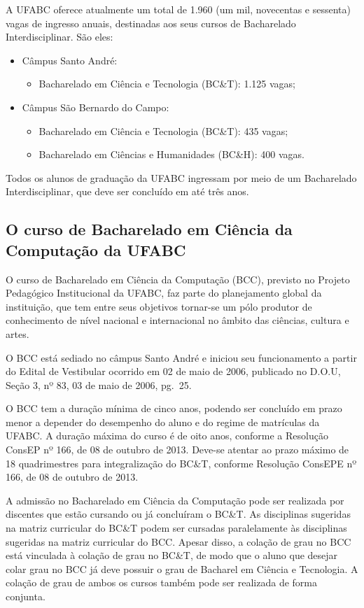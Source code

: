 A UFABC oferece atualmente um total de 1.960 (um mil, novecentas e sessenta)
vagas de ingresso anuais, destinadas aos seus cursos de Bacharelado
Interdisciplinar. São eles:
\begin{itemize}
    \item Câmpus Santo André:
    \begin{itemize}
        \item Bacharelado em Ciência e Tecnologia (BC\&T): 1.125 vagas;
    \end{itemize}
    \item Câmpus São Bernardo do Campo:
    \begin{itemize}
        \item Bacharelado em Ciência e Tecnologia (BC\&T): 435 vagas;
        \item Bacharelado em Ciências e Humanidades (BC\&H): 400 vagas.
    \end{itemize}
\end{itemize}

Todos os alunos de graduação da UFABC ingressam por meio de um Bacharelado
Interdisciplinar, que deve ser concluído em até três anos.


\subsection{O curso de Bacharelado em Ciência da Computação da UFABC}

O curso de Bacharelado em Ciência da Computação (BCC), previsto no Projeto
Pedagógico Institucional da UFABC, faz parte do planejamento global da
instituição, que tem entre seus objetivos tornar-se um pólo produtor de
conhecimento de nível nacional e internacional no âmbito das ciências, cultura
e artes.

O BCC está sediado no câmpus Santo André e iniciou seu funcionamento a partir
do Edital de Vestibular ocorrido em 02 de maio de 2006, publicado no D.O.U,
Seção 3, nº 83, 03 de maio de 2006, pg.\ 25.

O BCC tem a duração mínima de cinco anos, podendo ser concluído em prazo menor
a depender do desempenho do aluno e do regime de matrículas da UFABC.
A duração máxima do curso é de oito anos, conforme a Resolução ConsEP nº 166,
de 08 de outubro de 2013.
Deve-se atentar ao prazo máximo de 18 quadrimestres para integralização do
BC\&T, conforme Resolução ConsEPE nº 166, de 08 de outubro de 2013.

A admissão no Bacharelado em Ciência da Computação pode ser realizada por
discentes que estão cursando ou já concluíram o BC\&T.
As disciplinas sugeridas na matriz curricular do BC\&T podem ser cursadas
paralelamente às disciplinas sugeridas na matriz curricular do BCC.
Apesar disso, a colação de grau no BCC está vinculada à colação de grau no
BC\&T, de modo que o aluno que desejar colar grau no BCC já deve possuir o grau
de Bacharel em Ciência e Tecnologia.
A colação de grau de ambos os cursos também pode ser realizada de forma conjunta.


